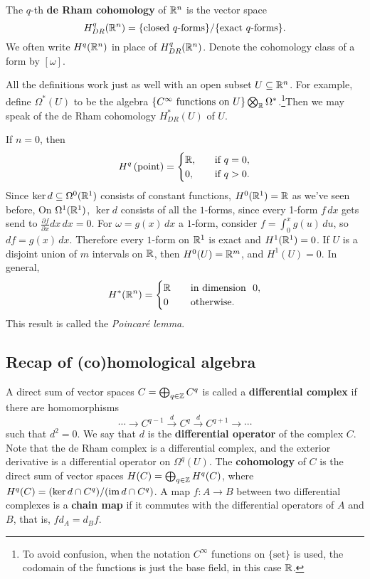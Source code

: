 \begin{definition}[]
    The $q$-th \textbf{de Rham cohomology} of $\mathbb{R}^n $ is the vector space \[
        H_{DR}^q (\R^n )= \{\text{closed} \ q\text{-forms}\} / \{\text{exact} \ q\text{-forms}  \} .
    \] We often write $H^q(\mathbb{R}^n )$ in place of $H_{DR}^q(\mathbb{R}^n )$. Denote the cohomology class of a form by $[\omega]$.
\end{definition}
All the definitions work just as well with an open subset $U\subseteq \mathbb{R}^n $. For example, define $\Omega^*(U)$ to be the algebra $\{C^{\infty} \ \text{functions on} \ U\} \bigotimes _{\R}\Omega^*$.\footnote{To avoid confusion, when the notation $C^{\infty}$ functions on $\{\text{set} \} $ is used, the codomain of the functions is just the base field, in this case $\mathbb{R}$.}Then we may speak of the de Rham cohomology $H_{DR}^*(U)$ of $U$.
\begin{example}
    If $n=0$, then \[
        H^q \left( \text{point}   \right) =
    \begin{cases}
        \mathbb{R},\quad &\text{if} \ q=0,\\
        0,& \text{if} \ q>0.
    \end{cases}
\] Since $\ker d \subseteq \Omega^0(\mathbb{R}^1)$ consists of constant functions, $H^0(\mathbb{R}^1)=\mathbb{R}$ as we've seen before, On $\Omega^1(\mathbb{R}^1)$, $\ker d$ consists of all the $1$-forms, since every 1-form $f\,dx$ gets send to $\frac{\partial f}{\partial x}dx\,dx=0$. For $\omega=g(x)\,dx$ a $1$-form, consider $f= \int_{0}^{x} g(u) \, du$, so $df=g(x)\,dx$. Therefore every $1$-form on $\mathbb{R}^1$ is exact and $H^1(\mathbb{R}^1)=0$. If $U$ is a disjoint union of $m$ intervals on $\mathbb{R}$, then $H^0(U)=\mathbb{R}^m$, and $H^1(U)=0$. In general, 
\[
    H^*(\mathbb{R}^n )=
    \begin{cases}
        \mathbb{R}\quad& \text{in dimension } \ 0,\\
        0 & \text{otherwise.} 
    \end{cases}
\] This result is called the \emph{Poincar\'e lemma}.
\end{example}

\subsection{Recap of (co)homological algebra}
A direct sum of vector spaces $C=\bigoplus_{q\in \mathbb{Z}}C^q$ is called a \textbf{differential complex} if there are homomorphisms \[
    \cdots \to C^{q-1}\overset{d}{\to } C^q \overset{d}{\to } C^{q+1}\to \cdots 
\] such that $d^2=0$. We say that $d$ is the \textbf{differential operator} of the complex $C$. Note that the de Rham complex is a differential complex, and the exterior derivative is a differential operator on  $\Omega^q(U)$. The \textbf{cohomology} of $C$ is the direct sum of vector spaces $H(C)=\bigoplus_{q\in \mathbb{Z}}H^q(C)$, where $H^q(C)=(\ker d \cap C^q) / (\operatorname{im} d \cap C^q)$. A map $f \colon A \to B$ between two differential complexes is a \textbf{chain map} if it commutes with the differential operators of $A$ and $B$, that is, $f d_A=d_Bf$. 


